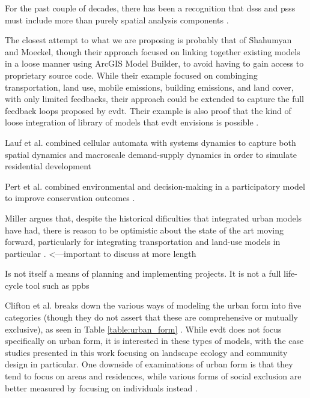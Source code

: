 For the past couple of decades, there has been a recognition that \acp{dss} and \acp{pss} must include more than purely spatial analysis components \cite{geertmanPlanningSupportSystems2004}.

The closest attempt to what we are proposing is probably that of Shahumyan and Moeckel, though their approach focused on linking together existing models in a loose manner using ArcGIS Model Builder, to avoid having to gain access to proprietary source code. While their example focused on combinging transportation, land use, mobile emissions, building emissions, and land cover, with only limited feedbacks, their approach could be extended to capture the full feedback loops proposed by \ac{evdt}. Their example is also proof that the kind of loose integration of library of models that \ac{evdt} envisions is possible \cite{shahumyanIntegrationLandUse2017}. 

Lauf et al. combined cellular automata with systems dynamics to capture both spatial dynamics and macroscale demand-supply dynamics in order to simulate residential development \cite{laufUncoveringLanduseDynamics2012}

Pert et al. combined environmental and decision-making in a participatory model to improve conservation outcomes \cite{pertParticipatoryDevelopmentNew2013}. 

Miller argues that, despite the historical dificulties that integrated urban models have had, there is reason to be optimistic about the state of the art moving forward, particularly for integrating transportation and land-use models in particular \cite{millerIntegratedUrbanModeling2018}. <---important to discuss at more length

Is not itself a means of planning and implementing projects. It is not a full life-cycle tool such as \ac{ppbs} \cite{hatryCriteriaEvaluationPlanning1972}

Clifton et al. breaks down the various ways of modeling the urban form into five categories (though they do not assert that these are comprehensive or mutually exclusive), as seen in Table \ref{table:urban_form} \cite{cliftonQuantitativeAnalysisUrban2008}. While \ac{evdt} does not focus specifically on urban form, it is interested in these types of models, with the case studies presented in this work focusing on landscape ecology and community design in particular. One downside of examinations of urban form is that they tend to focus on areas and residences, while various forms of social exclusion are better measured by focusing on individuals instead \cite{scottRoleUrbanForm2008}.

